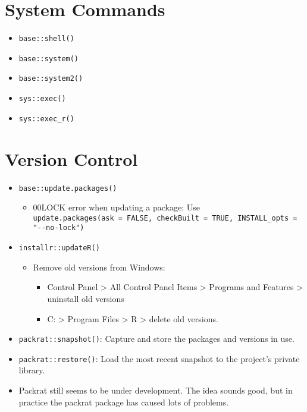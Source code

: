 \documentclass[
]{book}
\providecommand{\tightlist}{%
  \setlength{\itemsep}{0pt}\setlength{\parskip}{0pt}}
\begin{document}
\hypertarget{system-commands}{%
\section{System Commands}\label{system-commands}}

\begin{itemize}
\tightlist
\item
  \texttt{base::shell()}
\item
  \texttt{base::system()}
\item
  \texttt{base::system2()}
\item
  \texttt{sys::exec()}
\item
  \texttt{sys::exec\_r()}
\end{itemize}

\hypertarget{version-control}{%
\section{Version Control}\label{version-control}}

\begin{itemize}
\tightlist
\item
  \texttt{base::update.packages()}

  \begin{itemize}
  \tightlist
  \item
    00LOCK error when updating a package: Use \texttt{update.packages(ask\ =\ FALSE,\ checkBuilt\ =\ TRUE,\ INSTALL\_opts\ =\ "-\/-no-lock")}
  \end{itemize}
\item
  \texttt{installr::updateR()}

  \begin{itemize}
  \tightlist
  \item
    Remove old versions from Windows:

    \begin{itemize}
    \tightlist
    \item
      Control Panel \textgreater{} All Control Panel Items \textgreater{} Programs and Features \textgreater{} uninstall old versions
    \item
      C: \textgreater{} Program Files \textgreater{} R \textgreater{} delete old versions.
    \end{itemize}
  \end{itemize}
\item
  \texttt{packrat::snapshot()}: Capture and store the packages and versions in use.
\item
  \texttt{packrat::restore()}: Load the most recent snapshot to the project's private library.
\item
  Packrat still seems to be under development. The idea sounds good, but in practice the packrat package has caused lots of problems.
\end{itemize}
\end{document}
